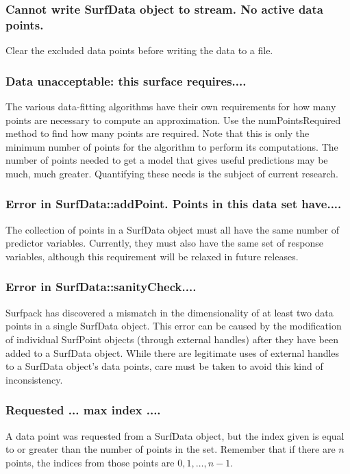 \documentclass{article}
\begin{document}
\subsubsection{Cannot write SurfData object to stream.  No active data points.}
Clear the excluded data points before writing the data to a file.

\subsubsection{Data unacceptable: this surface requires....} 
The various data-fitting algorithms have their own requirements for how many points are necessary to compute an approximation.  Use the numPointsRequired method to find how many points are required.  Note that this is only the minimum number of points for the algorithm to perform its computations.  The number of points needed to get a model that gives useful predictions may be much, much greater.  Quantifying these needs is the subject of current research.

\subsubsection{Error in SurfData::addPoint. Points in this data set have....}
The collection of points in a SurfData object must all have the same number of predictor variables.  Currently, they must also have the same set of response variables, although this requirement will be relaxed in future releases.

\subsubsection{Error in SurfData::sanityCheck....} 
Surfpack has discovered a mismatch in the dimensionality of at least two data points in a single SurfData object.  This error can be caused by the modification of individual SurfPoint objects (through external handles) after they have been added to a SurfData object.  While there are legitimate uses of external handles to a SurfData object's data points, care must be taken to avoid this kind of inconsistency.

\subsubsection{Requested ... max index ....}
A data point was requested from a SurfData object, but the index given is equal to or greater than the number of points in the set.  Remember that if there are $n$ points, the indices from those points are $0, 1, \ldots, n-1$.
\end{document}
